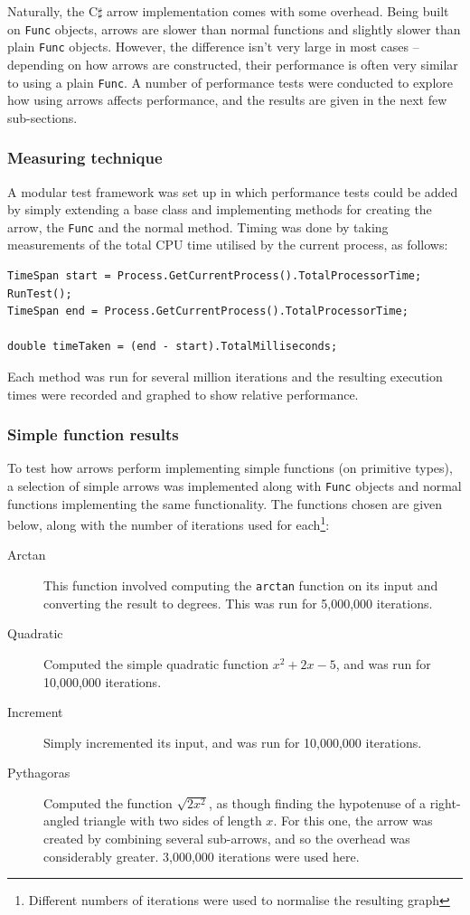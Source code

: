 \documentclass[12pt,twoside,notitlepage]{report}
\begin{document}
Naturally, the C$\sharp$ arrow implementation comes with some overhead. Being built on \texttt{Func} objects, arrows are slower than normal functions and slightly slower than plain \texttt{Func} objects. However, the difference isn't very large in most cases -- depending on how arrows are constructed, their performance is often very similar to using a plain \texttt{Func}. A number of performance tests were conducted to explore how using arrows affects performance, and the results are given in the next few sub-sections.

\subsubsection{Measuring technique}

A modular test framework was set up in which performance tests could be added by simply extending a base class and implementing methods for creating the arrow, the \texttt{Func} and the normal method. Timing was done by taking measurements of the total CPU time utilised by the current process, as follows:

\begin{lstlisting}[language={[sharp]C}]
TimeSpan start = Process.GetCurrentProcess().TotalProcessorTime;
RunTest();
TimeSpan end = Process.GetCurrentProcess().TotalProcessorTime;

double timeTaken = (end - start).TotalMilliseconds;
\end{lstlisting}

Each method was run for several million iterations and the resulting execution times were recorded and graphed to show relative performance.

\subsubsection{Simple function results}

To test how arrows perform implementing simple functions (on primitive types), a selection of simple arrows was implemented along with \texttt{Func} objects and normal functions implementing the same functionality. The functions chosen are given below, along with the number of iterations used for each\footnote{Different numbers of iterations were used to normalise the resulting graph}:

\begin{description}
	\item[Arctan] This function involved computing the \texttt{arctan} function on its input and converting the result to degrees. This was run for 5,000,000 iterations.
	\item[Quadratic] Computed the simple quadratic function $x^2 + 2x - 5$, and was run for 10,000,000 iterations.
	\item[Increment] Simply incremented its input, and was run for 10,000,000 iterations.
	\item[Pythagoras] Computed the function $\sqrt{2 x^2}$, as though finding the hypotenuse of a right-angled triangle with two sides of length $x$. For this one, the arrow was created by combining several sub-arrows, and so the overhead was considerably greater. 3,000,000 iterations were used here.
\end{description}
\end{document}
